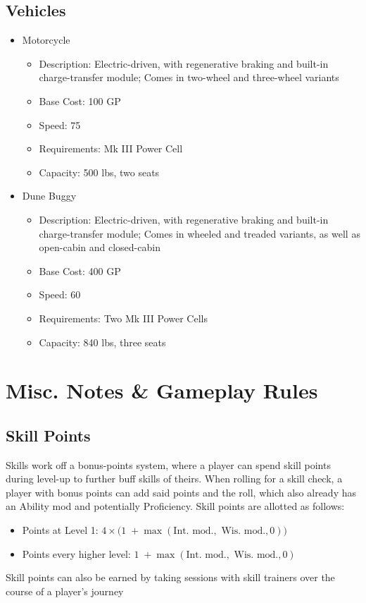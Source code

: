 \documentclass[12pt, twoside]{article}
\begin{document}
\begin{FlushLeft}
\begin{multicols}{2}
			\subsection{Vehicles}
			\begin{itemize}[wide]
				\item Motorcycle
				\begin{itemize}
					\item Description: Electric-driven, with regenerative braking and built-in charge-transfer module; Comes in two-wheel and three-wheel variants
					\item Base Cost: 100 GP
					\item Speed: 75
					\item Requirements: Mk III Power Cell
					\item Capacity: 500 lbs, two seats
				\end{itemize}
				\item Dune Buggy
				\begin{itemize}
					\item Description: Electric-driven, with regenerative braking and built-in charge-transfer module; Comes in wheeled and treaded variants, as well as open-cabin and closed-cabin
					\item Base Cost: 400 GP
					\item Speed: 60
					\item Requirements: Two Mk III Power Cells
					\item Capacity: 840 lbs, three seats
				\end{itemize}
			\end{itemize}
			\vfill \pagebreak

			\section{Misc. Notes \& Gameplay Rules}
			\subsection{Skill Points}
			Skills work off a bonus-points system, where a player can spend skill points during level-up to further buff skills of theirs.
			When rolling for a skill check, a player with bonus points can add said points and the roll, which also already has an Ability mod and potentially Proficiency.
			Skill points are allotted as follows:
			\begin{itemize}
				\item Points at Level 1: \linebreak $4 \times \big(1 \; + \max(\text{Int. mod.}, \text{ Wis. mod.}, 0)\big)$
				\item Points every higher level: \linebreak $1 \; + \max(\text{Int. mod.}, \text{ Wis. mod.}, 0)$
			\end{itemize}
			Skill points can also be earned by taking sessions with skill trainers over the course of a player's journey

\end{multicols}
\end{FlushLeft}
\end{document}
